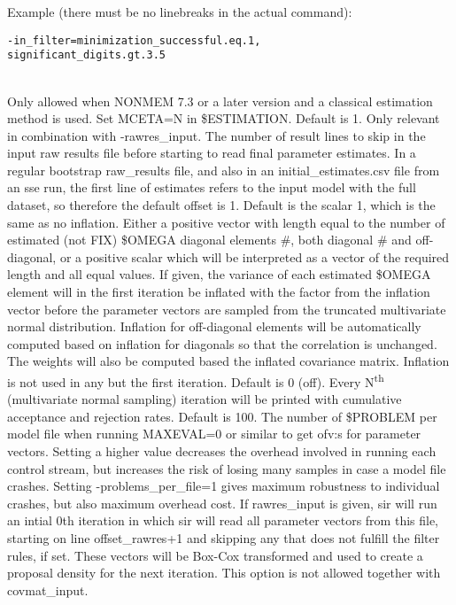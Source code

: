 \begin{optionlist}
Example (there must be no linebreaks in the actual command):
\begin{verbatim}
-in_filter=minimization_successful.eq.1,
significant_digits.gt.3.5
\end{verbatim} \\
\nextopt
{}
Only allowed when NONMEM 7.3 or a later version and a classical estimation method is used. Set MCETA=N in \$ESTIMATION.
\nextopt
{}
Default is 1. Only relevant in combination with -rawres\_input. The number of result lines to skip in the input raw results file before starting to read final parameter estimates. In a regular bootstrap raw\_results file, and also in an initial\_estimates.csv file from an sse run, the first line of estimates refers to the input model with the full dataset, so therefore the default offset is 1.
\nextopt
{}
Default is the scalar 1, which is the same as no inflation. Either a positive vector with length equal to the number of estimated (not FIX) \$OMEGA diagonal elements \#, both diagonal \# and off-diagonal, or a positive scalar which will be interpreted as a vector of the required length and all equal values. If given, the variance of each estimated \$OMEGA element will in the first iteration be inflated with the factor from the inflation vector before the parameter vectors are sampled from the truncated multivariate normal distribution. Inflation for off-diagonal elements will be automatically computed based on inflation for diagonals so that the correlation is unchanged. The weights will also be computed based the inflated covariance matrix. Inflation is not used in any but the first iteration.
\nextopt
{}
Default is 0 (off). Every N\textsuperscript{th} (multivariate normal sampling) iteration will be printed with cumulative acceptance and rejection rates.
\nextopt
{}
Default is 100. The number of \$PROBLEM per model file when running MAXEVAL=0 or similar to get ofv:s for parameter vectors. Setting a higher value decreases the overhead involved in running each control stream, but increases the risk of losing many samples in case a model file crashes. Setting -problems\_per\_file=1 gives maximum robustness to individual crashes, but also maximum overhead cost.
\nextopt
{}
If rawres\_input is given, sir will run an intial 0th iteration in which sir will read all parameter vectors from this file, starting on line offset\_rawres+1 and skipping any that does not fulfill the filter rules, if set. These vectors will be Box-Cox transformed and used to create a proposal density for the next iteration. This option is not allowed together with covmat\_input.


\end{optionlist}
